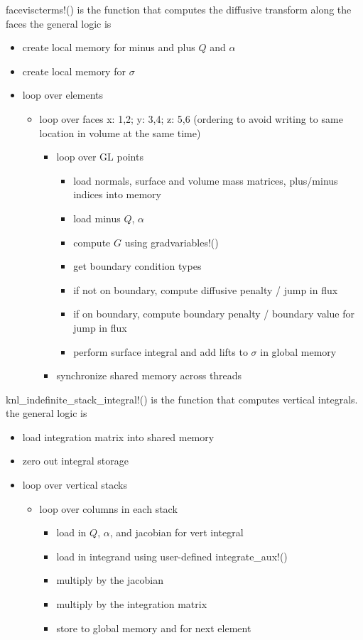 \documentclass{article}
\begin{document}
faceviscterms!() is the function that computes the diffusive transform along the faces
the general logic is
\begin{itemize}
    \item create local memory for minus and plus $Q$ and $\alpha$
    \item create local memory for $\sigma$
    \item loop over elements
    \begin{itemize}
        \item loop over faces x: 1,2; y: 3,4; z: 5,6 (ordering to avoid writing to same location in volume at the same time)
        \begin{itemize}
            \item loop over GL points
            \begin{itemize}
                \item load normals, surface and volume mass matrices, plus/minus indices into memory
                \item load minus $Q$, $\alpha$
                \item compute $G$ using gradvariables!()
                \item get boundary condition types
                \item if not on boundary, compute diffusive penalty / jump in flux
                \item if on boundary, compute boundary penalty / boundary value for jump in flux
                \item perform surface integral and add lifts to $\sigma$ in global memory
            \end{itemize}
            \item synchronize shared memory across threads 
        \end{itemize}
    \end{itemize}
\end{itemize}
knl\_indefinite\_stack\_integral!() is the function that computes vertical integrals. 
the general logic is
\begin{itemize}
    \item load integration matrix into shared memory
    \item zero out integral storage
    \item loop over vertical stacks
    \begin{itemize}
        \item loop over columns in each stack
        \begin{itemize}
            \item load in $Q$, $\alpha$, and jacobian for vert integral
            \item load in integrand using user-defined integrate\_aux!()
            \item multiply by the jacobian
            \item multiply by the integration matrix
            \item store to global memory and for next element
        \end{itemize}
    \end{itemize}
\end{itemize}
\end{document}
